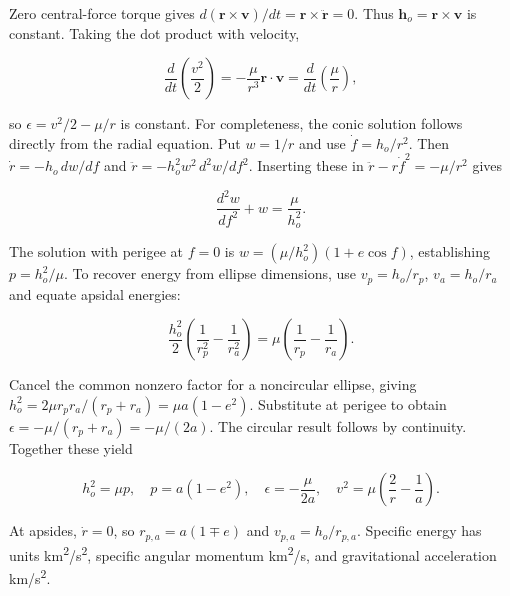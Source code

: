 \documentclass[10pt,a4paper]{article}
\numberwithin{equation}{section}
\begin{document}
\begin{sloppypar}Zero central-force torque gives \(d(\mathbf r\times\mathbf v)/dt=\mathbf r\times\ddot{\mathbf r}=0\). Thus \(\mathbf h_o=\mathbf r\times\mathbf v\) is constant. Taking the dot product with velocity,\end{sloppypar}


\begin{equation}\frac{d}{dt}\left(\frac{v^2}{2}\right)
=-\frac{\mu}{r^3}\mathbf r\cdot\mathbf v
=\frac{d}{dt}\left(\frac{\mu}{r}\right),\label{eq:ch2-2}\end{equation}

\begin{sloppypar}so \(\epsilon=v^2/2-\mu/r\) is constant. For completeness, the conic solution follows directly from the radial equation. Put \(w=1/r\) and use \(\dot f=h_o/r^2\). Then \(\dot r=-h_o\,dw/df\) and \(\ddot r=-h_o^2w^2\,d^2w/df^2\). Inserting these in \(\ddot r-r\dot f^2=-\mu/r^2\) gives\end{sloppypar}


\begin{equation}\frac{d^2w}{df^2}+w=\frac{\mu}{h_o^2}.\label{eq:ch2-3}\end{equation}

\begin{sloppypar}The solution with perigee at \(f=0\) is \(w=(\mu/h_o^2)(1+e\cos f)\), establishing \(p=h_o^2/\mu\). To recover energy from ellipse dimensions, use \(v_p=h_o/r_p\), \(v_a=h_o/r_a\) and equate apsidal energies:\end{sloppypar}


\begin{equation}\frac{h_o^2}{2}\left(\frac1{r_p^2}-\frac1{r_a^2}\right)
=\mu\left(\frac1{r_p}-\frac1{r_a}\right).\label{eq:ch2-4}\end{equation}

\begin{sloppypar}Cancel the common nonzero factor for a noncircular ellipse, giving \(h_o^2=2\mu r_pr_a/(r_p+r_a)=\mu a(1-e^2)\). Substitute at perigee to obtain \(\epsilon=-\mu/(r_p+r_a)=-\mu/(2a)\). The circular result follows by continuity. Together these yield\end{sloppypar}


\begin{equation}h_o^2=\mu p,\quad p=a(1-e^2),\quad
\epsilon=-\frac{\mu}{2a},\quad
v^2=\mu\left(\frac2r-\frac1a\right).\label{eq:ch2-5}\end{equation}

\begin{sloppypar}At apsides, \(\dot r=0\), so \(r_{p,a}=a(1\mp e)\) and \(v_{p,a}=h_o/r_{p,a}\). Specific energy has units km\textsuperscript{2}/s\textsuperscript{2}, specific angular momentum km\textsuperscript{2}/s, and gravitational acceleration km/s\textsuperscript{2}.\end{sloppypar}
\end{document}
